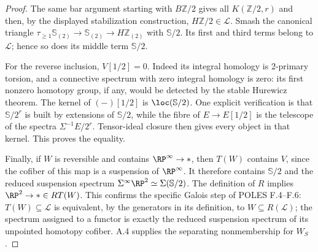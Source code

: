 \begin{proof}
The same bar argument starting with $B\mathbb Z/2$ gives all $K(\mathbb Z/2,r)$ and then, by the displayed stabilization construction, $H\mathbb Z/2\in\mathcal L$. Smash the canonical triangle
$\tau_{\geq1}\mathbb S_{(2)}\to\mathbb S_{(2)}\to H\mathbb Z_{(2)}$
with $\mathbb S/2$. Its first and third terms belong to $\mathcal L$; hence so does its middle term $\mathbb S/2$.

For the reverse inclusion, $V[1/2]=0$. Indeed its integral homology is $2$-primary torsion, and a connective spectrum with zero integral homology is zero: its first nonzero homotopy group, if any, would be detected by the stable Hurewicz theorem. The kernel of $(-)[1/2]$ is $\loc(\mathbb S/2)$. One explicit verification is that $\mathbb S/2^r$ is built by extensions of $\mathbb S/2$, while the fibre of $E\to E[1/2]$ is the telescope of the spectra $\Sigma^{-1}E/2^r$. Tensor-ideal closure then gives every object in that kernel. This proves the equality.

Finally, if $W$ is reversible and contains $\RP^\infty\to *$, then $T(W)$ contains $V$, since the cofiber of this map is a suspension of $\RP^\infty$. It therefore contains $\mathbb S/2$ and the reduced suspension spectrum $\Sigma^\infty\RP^2\simeq\Sigma(\mathbb S/2)$. The definition of $R$ implies $\RP^2\to *\in RT(W)$. This confirms the specific Galois step of POLES F.4--F.6: $T(W)\subseteq\mathcal L$ is equivalent, by the generators in its definition, to $W\subseteq R(\mathcal L)$; the spectrum assigned to a functor is exactly the reduced suspension spectrum of its unpointed homotopy cofiber. A.4 supplies the separating nonmembership for $W_S$.
\end{proof}


